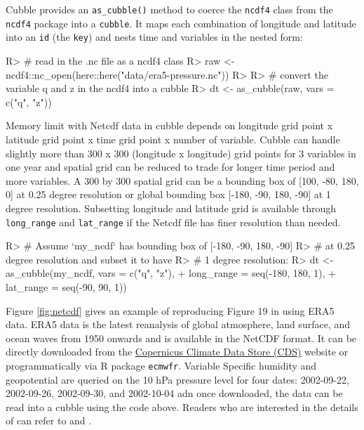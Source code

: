 \documentclass[
]{jss}
\begin{document}
Cubble provides an \texttt{as\_cubble()} method to coerce the
\texttt{ncdf4} class from the \texttt{ncdf4} package into a
\texttt{cubble}. It maps each combination of longitude and latitude into
an \texttt{id} (the \texttt{key}) and nests time and variables in the
nested form:

\begin{CodeChunk}
\begin{CodeInput}
R> # read in the .nc file as a ncdf4 class
R> raw <- ncdf4::nc_open(here::here("data/era5-pressure.nc"))
R> 
R> # convert the variable q and z in the ncdf4 into a cubble
R> dt <- as_cubble(raw, vars = c("q", "z"))
\end{CodeInput}
\end{CodeChunk}

Memory limit with Netcdf data in cubble depends on longitude grid point
x latitude grid point x time grid point x number of variable. Cubble can
handle slightly more than 300 x 300 (longitude x longitude) grid points
for 3 variables in one year and spatial grid can be reduced to trade for
longer time period and more variables. A 300 by 300 spatial grid can be
a bounding box of {[}100, -80, 180, 0{]} at 0.25 degree resolution or
global bounding box {[}-180, -90, 180, -90{]} at 1 degree resolution.
Subsetting longitude and latitude grid is available through
\texttt{long\_range} and \texttt{lat\_range} if the Netcdf file has
finer resolution than needed.

\begin{CodeChunk}
\begin{CodeInput}
R> # Assume `my_ncdf` has bounding box of [-180, -90, 180, -90] 
R> # at 0.25 degree resolution and subset it to have 
R> # 1 degree resolution:
R> dt <- as_cubble(my_ncdf, vars = c("q", "z"), 
+                 long_range = seq(-180, 180, 1), 
+                 lat_range = seq(-90, 90, 1))
\end{CodeInput}
\end{CodeChunk}

Figure \ref{fig:netcdf} gives an example of reproducing Figure 19 in
\citet{hersbach2020era5} using ERA5 data. ERA5 data
\citep{hersbach2020era5} is the latest reanalysis of global atmosphere,
land surface, and ocean waves from 1950 onwards and is available in the
NetCDF format. It can be directly downloaded from the
\href{https://cds.climate.copernicus.eu/cdsapp\#!/dataset/reanalysis-era5-pressure-levels?tab=overview}{Copernicus
Climate Data Store (CDS)} website or programmatically via R package
\texttt{ecmwfr}\citep{ecwmfr}. Variable Specific humidity and
geopotential are queried on the 10 hPa pressure level for four dates:
2002-09-22, 2002-09-26, 2002-09-30, and 2002-10-04 adn once downloaded,
the data can be read into a cubble using the code above. Readers who are
interested in the details of can refer to \citet{simmons2020global} and
\citet{simmons2005ecmwf}.
\end{document}
